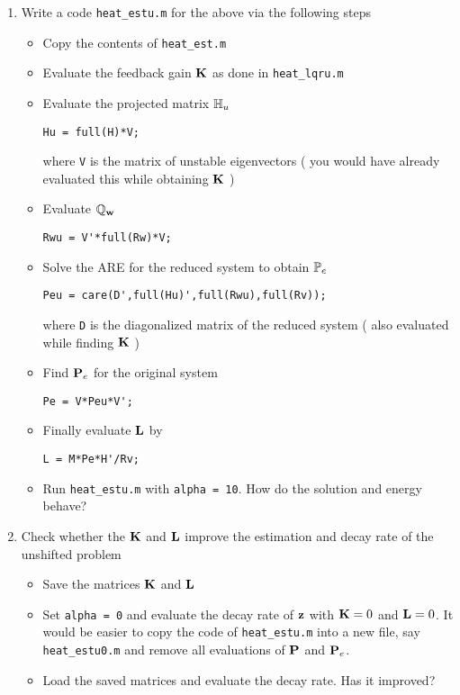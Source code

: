 \documentclass[12pt]{article}
\begin{document}
\begin{enumerate}

\item Write a code {\tt heat\_estu.m} for the above via the following steps
\begin{itemize}
\item Copy the contents of {\tt heat\_est.m}

\item Evaluate the feedback gain ${\mathbf K}$ as done in {\tt heat\_lqru.m}

\item Evaluate the projected matrix $\mathbb{H}_u$ 
\begin{lstlisting}
Hu = full(H)*V; 
\end{lstlisting}
where {\tt V} is the matrix of unstable eigenvectors ( you would have already evaluated this while obtaining ${\mathbf K}$ )

\item Evaluate $\mathbb{Q}_{\mathbf w}$ 
\begin{lstlisting}
Rwu = V'*full(Rw)*V; 
\end{lstlisting}

\item Solve the ARE for the reduced system to obtain $\mathbb{P}_e$
\begin{lstlisting}
Peu = care(D',full(Hu)',full(Rwu),full(Rv));
\end{lstlisting}
where {\tt D} is the diagonalized matrix of the reduced system ( also evaluated while finding ${\mathbf K}$ )

\item Find ${\mathbf P}_e$ for the original system
\begin{lstlisting}
Pe = V*Peu*V'; 
\end{lstlisting}

\item Finally evaluate ${\mathbf L}$ by
\begin{lstlisting}
L = M*Pe*H'/Rv; 
\end{lstlisting}

\item Run {\tt heat\_estu.m} with {\tt alpha = 10}. How do the solution and energy behave?

\end{itemize}

\item Check whether the ${\mathbf K}$ and ${\mathbf L}$ improve the estimation and decay rate of the unshifted problem 

\begin{itemize}
\item Save the matrices ${\mathbf K}$ and ${\mathbf L}$
    
\item Set {\tt alpha = 0} and evaluate the decay rate of ${\mathbf z}$ with ${\mathbf K} = 0$ and ${\mathbf L}=0$. It would be easier to copy the code of {\tt heat\_estu.m} into a new file, say {\tt heat\_estu0.m} and remove all evaluations of ${\mathbf P}$ and ${\mathbf P}_e$.
    
\item Load the saved matrices and evaluate the decay rate. Has it improved?
\end{itemize}

\end{enumerate}
\end{document}
